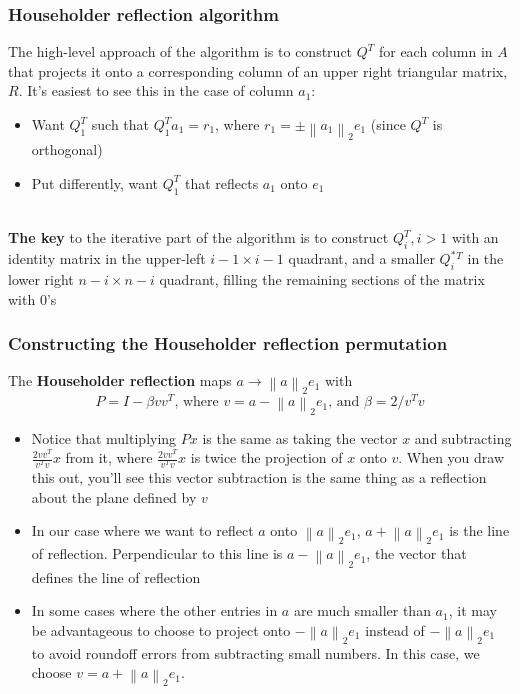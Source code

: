 \documentclass{article}
\newcommand{\norm}[2]{\left\lVert#1\right\rVert_#2}
\begin{document}
\subsubsection{Householder reflection algorithm}
The high-level approach of the algorithm is to construct $Q^T$ for each column in $A$ that projects it onto a corresponding column of an upper right triangular matrix, $R$. It's easiest to see this in the case of column $a_1$:\
\begin{itemize}
    \item Want $Q_1^T$ such that $Q_1^Ta_1 = r_1$, where $r_1 = \pm \norm{a_1}{2}e_1$ (since $Q^T$ is orthogonal)
    \item Put differently, want $Q_1^T$ that reflects $a_1$ onto $e_1$
\end{itemize}\\
\noindent \textbf{The key} to the iterative part of the algorithm is to construct $Q_i^T, i > 1$ with an identity matrix in the upper-left $i-1 \times i-1$ quadrant, and a smaller $Q^*_i^T$ in the lower right $n-i \times n-i$ quadrant, filling the remaining sections of the matrix with $0$'s

\subsubsection{Constructing the Householder reflection permutation}
\noindent The \textbf{Householder reflection} maps $a \rightarrow \norm{a}{2}e_1$ with
\begin{equation*}
    P = I - \beta vv^T \textrm{, where $v = a - \norm{a}{2}e_1$, and $\beta = 2/v^Tv$}
\end{equation*}
\begin{itemize}
    \item Notice that multiplying $Px$ is the same as taking the vector $x$ and subtracting $\frac{2vv^T}{v^Tv}x$ from it, where $\frac{2vv^T}{v^Tv}x$ is twice the projection of $x$ onto $v$. When you draw this out, you'll see this vector subtraction is the same thing as a reflection about the plane defined by $v$
    \item In our case where we want to reflect $a$ onto $\norm{a}{2}e_1$,  $a + \norm{a}{2}e_1$ is the line of reflection. Perpendicular to this line is $a - \norm{a}{2}e_1$, the vector that defines the line of reflection
    \item In some cases where the other entries in $a$ are much smaller than $a_1$, it may be advantageous to choose to project onto $-\norm{a}{2}e_1$ instead of $-\norm{a}{2}e_1$ to avoid roundoff errors from subtracting small numbers. In this case, we choose $v = a + \norm{a}{2}e_1$.
\end{itemize}
\end{document}
